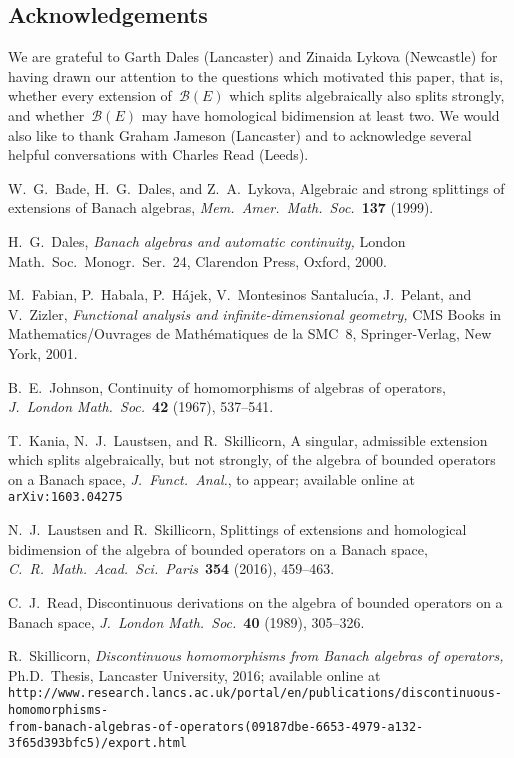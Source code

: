 \documentclass[12pt,reqno]{amsart}
\theoremstyle{definition}
\numberwithin{equation}{section}
\begin{document}
\subsection*{Acknowledgements} We are grateful to 
Garth Dales (Lancaster) and Zinaida Lykova (Newcastle) for having
drawn our attention to the questions which motivated this paper, that
is, whether every extension of~$\mathscr{B}(E)$ which splits
algebraically also splits strongly, and whether~$\mathscr{B}(E)$ may
have homological bidimension at least two. We would also like to thank
Graham Jameson (Lancaster) and to acknowledge several helpful
conversations with Charles Read (Leeds).


\begin{thebibliography}{99}

 W.~G.~Bade, H.~G.~Dales, and Z.~A.~Lykova, Algebraic and
  strong splittings of extensions of Banach algebras, \emph{Mem.\
    Amer.\ Math.\ Soc.}~\textbf{137} (1999).

 H.~G.~Dales, \emph{Banach algebras and automatic
  continuity,} London Math.\ Soc.\ Monogr.\ Ser.~24, Clarendon Press,
  Oxford, 2000.

 M.~Fabian, P.~Habala, P.~H\'{a}jek, V.~Montesinos
  Santaluc\'{\i}a, J.~Pelant, and V.~Zizler, \emph{Functional analysis
    and infinite-dimensional geometry,}  CMS Books in
  Mathematics/Ouvrages de Math\'{e}matiques de la SMC~8,
  Springer-Verlag, New York, 2001.

 B.~E.~Johnson, Continuity of homomorphisms of
  algebras of operators, \emph{J.~London Math.\ Soc.}~\textbf{42}
  (1967), 537--541.

 T.~Kania, N.~J.~Laustsen, and R.~Skillicorn, A singular,
  admissible extension which splits algebraically, but not strongly,
  of the algebra of bounded operators on a Banach space,
  \emph{J.~Funct.~Anal.}, to appear; available online at
  \texttt{arXiv:1603.04275}

 N.~J.~Laustsen and R.~Skillicorn, Splittings of extensions and homological
  bi\-dimen\-sion of the algebra of bounded operators on a Banach
  space, \emph{C.~R.~Math.\ Acad.\ Sci.\ Paris}~\textbf{354} (2016), 459--463.

  C.~J.~Read, Discontinuous derivations on the 
algebra of bounded operators on a Banach space, \emph{J.~London 
Math.\ Soc.}~\textbf{40} (1989), 305--326.

 R.~Skillicorn, \emph{Discontinuous homomorphisms from
Banach algebras of operators,} 
{Ph.D.\ Thesis,} Lancaster University, 2016; available online at\\
\texttt{http:\!/\!/www.research.lancs.ac.uk/portal/en/publications/discontinuous-homomorphisms-}\\
\texttt{from-banach-algebras-of-operators(09187dbe-6653-4979-a132-3f65d393bfc5)/export.html}
\end{thebibliography}
\end{document}
